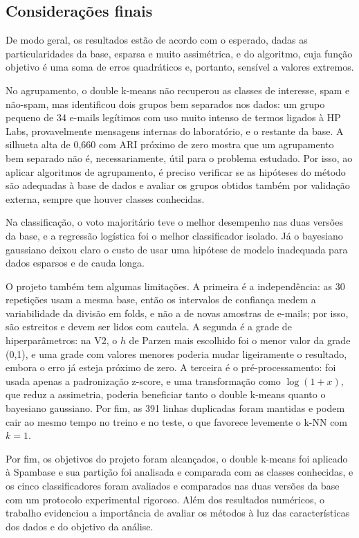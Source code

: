 \documentclass[12pt,reqno]{amsart}
\begin{document}
\subsection{Considerações finais}

De modo geral, os resultados estão de acordo com o esperado, dadas as particularidades da base, esparsa e muito assimétrica, e do algoritmo, cuja função objetivo é uma soma de erros quadráticos e, portanto, sensível a valores extremos.

No agrupamento, o double k-means não recuperou as classes de interesse, spam e não-spam, mas identificou dois grupos bem separados nos dados: um grupo pequeno de 34 e-mails legítimos com uso muito intenso de termos ligados à HP Labs, provavelmente mensagens internas do laboratório, e o restante da base. A silhueta alta de 0,660 com ARI próximo de zero mostra que um agrupamento bem separado não é, necessariamente, útil para o problema estudado. Por isso, ao aplicar algoritmos de agrupamento, é preciso verificar se as hipóteses do método são adequadas à base de dados e avaliar os grupos obtidos também por validação externa, sempre que houver classes conhecidas.

Na classificação, o voto majoritário teve o melhor desempenho nas duas versões da base, e a regressão logística foi o melhor classificador isolado. Já o bayesiano gaussiano deixou claro o custo de usar uma hipótese de modelo inadequada para dados esparsos e de cauda longa.

O projeto também tem algumas limitações. A primeira é a independência: as 30 repetições usam a
mesma base, então os intervalos de confiança medem a variabilidade da divisão em folds, e não a
de novas amostras de e-mails; por isso, são estreitos e devem ser lidos com cautela. A segunda
é a grade de hiperparâmetros: na V2, o $h$ de Parzen mais escolhido foi o menor valor da grade
(0,1), e uma grade com valores menores poderia mudar ligeiramente o resultado, embora o erro já
esteja próximo de zero. A terceira é o pré-processamento: foi usada apenas a padronização
z-score, e uma transformação como $\log(1+x)$, que reduz a assimetria, poderia beneficiar tanto o
double k-means quanto o bayesiano gaussiano. Por fim, as 391 linhas duplicadas foram mantidas e
podem cair ao mesmo tempo no treino e no teste, o que favorece levemente o k-NN com $k=1$.

Por fim, os objetivos do projeto foram alcançados, o double k-means foi aplicado à Spambase e
sua partição foi analisada e comparada com as classes conhecidas, e os cinco classificadores
foram avaliados e comparados nas duas versões da base com um protocolo experimental rigoroso.
Além dos resultados numéricos, o trabalho evidenciou a importância de avaliar os métodos à luz
das características dos dados e do objetivo da análise.



\end{document}
